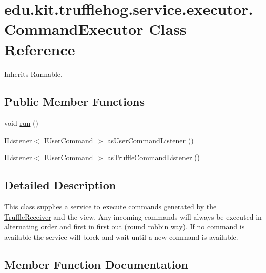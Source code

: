 \hypertarget{classedu_1_1kit_1_1trufflehog_1_1service_1_1executor_1_1_command_executor}{}\section{edu.\+kit.\+trufflehog.\+service.\+executor.\+Command\+Executor Class Reference}
\label{classedu_1_1kit_1_1trufflehog_1_1service_1_1executor_1_1_command_executor}


Inherits Runnable.

\subsection*{Public Member Functions}
\begin{DoxyCompactItemize}
\item 
void \hyperlink{classedu_1_1kit_1_1trufflehog_1_1service_1_1executor_1_1_command_executor_a179fc54a011445fca755a357c02d11e8}{run} ()
\item 
\hyperlink{interfaceedu_1_1kit_1_1trufflehog_1_1util_1_1_i_listener}{I\+Listener}$<$ \hyperlink{interfaceedu_1_1kit_1_1trufflehog_1_1command_1_1usercommand_1_1_i_user_command}{I\+User\+Command} $>$ \hyperlink{classedu_1_1kit_1_1trufflehog_1_1service_1_1executor_1_1_command_executor_ad8302308a58bc660754f2a9be3a7c3db}{as\+User\+Command\+Listener} ()
\item 
\hyperlink{interfaceedu_1_1kit_1_1trufflehog_1_1util_1_1_i_listener}{I\+Listener}$<$ \hyperlink{interfaceedu_1_1kit_1_1trufflehog_1_1command_1_1usercommand_1_1_i_user_command}{I\+User\+Command} $>$ \hyperlink{classedu_1_1kit_1_1trufflehog_1_1service_1_1executor_1_1_command_executor_ac9aba140c7517180c3cee3f8e587319e}{as\+Truffle\+Command\+Listener} ()
\end{DoxyCompactItemize}


\subsection{Detailed Description}
This class supplies a service to execute commands generated by the \hyperlink{}{Truffle\+Receiver} and the view. Any incoming commands will always be executed in alternating order and first in first out (round robbin way). If no command is available the service will block and wait until a new command is available. 

\subsection{Member Function Documentation}
\hypertarget{classedu_1_1kit_1_1trufflehog_1_1service_1_1executor_1_1_command_executor_ac9aba140c7517180c3cee3f8e587319e}{}
